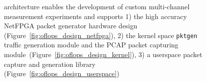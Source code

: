 \begin{figure}
\centering
{}
\label{fig:oflops_design}
\caption[\oflops architecture]{\oflops architecture enables the development of
  custom multi-channel measurement experiments and supports 1) the high accuracy
  NetFPGA packet generator hardware design
  (Figure~\ref{fig:oflops_design_netfpga}), 2) the kernel space {\tt pktgen}
  traffic generation module and the PCAP packet capturing
  module~(Figure~\ref{fig:oflops_design_kernel}), 3) a userspace packet capture
  and generation library (Figure~\ref{fig:oflops_design_userspace})} 
\end{figure}

